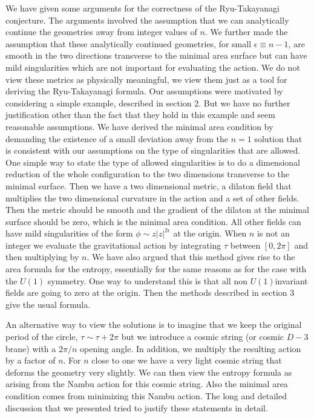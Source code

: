 We have given some arguments for the correctness of the Ryu-Takayanagi conjecture. The arguments involved
the assumption that we can analytically continue the geometries away from integer values of $n$.
We further made the assumption that these analytically continued geometries, for small $\epsilon \equiv  n-1$,
are smooth in the two directions transverse to the minimal area surface but can have mild singularities which
are not important for evaluating the action. We do not view these metrics as physically meaningful, we view
them just as a tool for deriving the Ryu-Takayanagi formula.
Our assumptions were motivated by considering a simple example, described in section 2.  But we  have no
further justification other than the fact that they hold in this example and seem reasonable assumptions.
We have derived the minimal area condition by  demanding the existence of a small deviation away from
the $n=1$ solution  that is consistent with our assumptions on the type of singularities that are allowed.
One simple way to state the type of allowed singularities is to do a dimensional reduction of the whole configuration
to the two dimensions transverse to the minimal surface. Then we have a two dimensional metric, a dilaton field that
multiplies the two dimensional curvature in the action and a set of other fields. Then the metric should be smooth and
the gradient of the dilaton at the minimal surface should be zero, which is the minimal area condition.
All other fields can have mild singularities of the form $ \phi \sim  z |z|^{ 2 \epsilon}$ at the origin.
  When $n$ is not an integer we evaluate the gravitational action by integrating $\tau$ between $[0,2\pi]$ and then multiplying by $n$.
We have also argued that this method gives rise to the area formula for the entropy, essentially for the same reasons
as for the case with the $U(1)$ symmetry. One way to understand this is that all non $U(1)$invariant fields are going
to zero at the origin.  Then the methods described in section 3 give the usual formula.

An alternative way to view the solutions is to imagine that we keep the original period of the circle,
$\tau \sim \tau + 2 \pi$ but we introduce a cosmic string  (or cosmic $D-3$ brane) with a
$2 \pi/n$ opening angle. In addition,  we multiply the resulting action by a factor of $n$. For $n$ close to
one we have a very light cosmic string that deforms the geometry very slightly.  We  can then view
the entropy formula as arising from the Nambu action for this cosmic string.  Also the
minimal area condition comes from minimizing this Nambu action. The long and detailed discussion
that we presented tried to justify these statements in detail.

